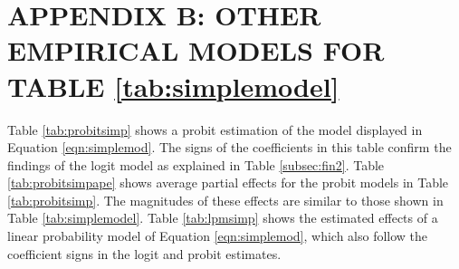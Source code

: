 \documentclass[floatsintext,man]{apa7}\usepackage[]{graphicx}\usepackage[]{color}
\begin{document}
\section{APPENDIX B: OTHER EMPIRICAL MODELS FOR TABLE \ref{tab:simplemodel}}
\label{app:second}
Table \ref{tab:probitsimp} shows a probit estimation of the model displayed in Equation \ref{eqn:simplemod}. The signs of the coefficients in this table confirm the findings of the logit model as explained in Table \ref{subsec:fin2}. Table \ref{tab:probitsimpape} shows average partial effects for the probit models in Table \ref{tab:probitsimp}. The magnitudes of these effects are similar to those shown in Table \ref{tab:simplemodel}. Table \ref{tab:lpmsimp} shows the estimated effects of a linear probability model of Equation \ref{eqn:simplemod}, which also follow the coefficient signs in the logit and probit estimates. 
\end{document}
